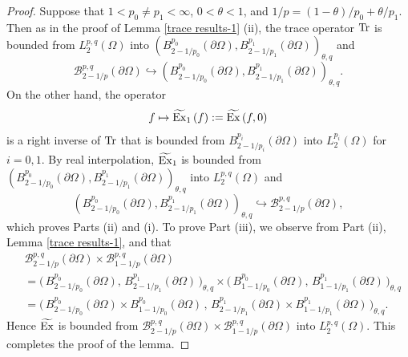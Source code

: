 \documentclass[reqno,centertags,11pt]{amsart}
\theoremstyle{definition}
\numberwithin{thm}{section}
\numberwithin{equation}{section}
\begin{document}
\begin{proof}
Suppose   that $1< p_0 \neq  p_1 <\infty$,  $0< \theta <1$, and $1/p=(1-\theta)/p_0+\theta/p_1$.  Then as in the proof of Lemma \ref{trace results-1} (ii), the trace operator        ${\rm Tr}$ is bounded from $L^{p,q}_{2}(\Omega)$ into $\left(  B^{p_0}_{2-1/p_0}(\partial \Omega ),  B^{p_1}_{2-1/p_1}(\partial \Omega ) \right)_{\theta,q}$ and
\[
 \mathcal B^{p,q}_{2-1/p}(\partial \Omega ) \hookrightarrow\left(  B^{p_0}_{2-1/p_0}(\partial \Omega ),  B^{p_1}_{2-1/p_1}(\partial \Omega ) \right)_{\theta,q}.
\]
On the other hand, the operator
\[
 f \mapsto \widetilde{\rm Ex}_1 \,( f) : = \widetilde{\rm  Ex} \, (f,0)
\]
is a  right inverse of  ${\rm  Tr} $ that is bounded from $B^{p_i}_{2-1/p_i}(\partial \Omega)$ into $L^{p_i}_{2}(\Omega)$  for $i=0,1$. By  real interpolation, $\widetilde{\rm Ex}_1$ is bounded from $\left(  B^{p_0}_{2-1/p_0}(\partial \Omega ),  B^{p_1}_{2-1/p_1}(\partial \Omega ) \right)_{\theta,q}$ into $L^{p,q}_{2}(\Omega)$ and
\[
\left(  B^{p_0}_{2-1/p_0}(\partial \Omega ),  B^{p_1}_{2-1/p_1}(\partial \Omega ) \right)_{\theta,q} \hookrightarrow \mathcal B^{p,q}_{2-1/p}(\partial \Omega ) ,
\]
which proves Parts (ii) and (i).  To prove Part (iii), we   observe from Part (ii), Lemma \ref{trace results-1}, and \cite[Chapter 3.13. Exercises 4]{bergh} that
\[\begin{split}
&\mathcal B^{p,q}_{2-1/p}(\partial \Omega ) \times \mathcal B^{p,q}_{1-1/p}(\partial \Omega )\\
&=\big(\, {B}^{p_0}_{2-1/p_0}(\partial\Omega),\, {B}^{p_1}_{2-1/p_1}(\partial\Omega)\,\big)_{\theta,q} \times \big(\, {B}^{p_0}_{1-1/p_0}(\partial\Omega),\, {B}^{p_1}_{1-1/p_1}(\partial\Omega)\,\big)_{\theta,q}\\
&=\big(\, {B}^{p_0}_{2-1/p_0}(\partial\Omega) \times {B}^{p_0}_{1-1/p_0}(\partial\Omega)\,,\,  {B}^{p_1}_{2-1/p_1}(\partial\Omega)\times {B}^{p_1}_{1-1/p_1}(\partial\Omega) \,\big)_{\theta,q}.
\end{split}\]
Hence   $\widetilde{\rm  Ex}$ is bounded from $\mathcal B^{p,q}_{2-1/p}(\partial \Omega ) \times \mathcal B^{p,q}_{1-1/p}(\partial \Omega )$ into $  L_2^{p,q}(\Omega )$.
This completes  the proof of the lemma.
\end{proof}
\end{document}

